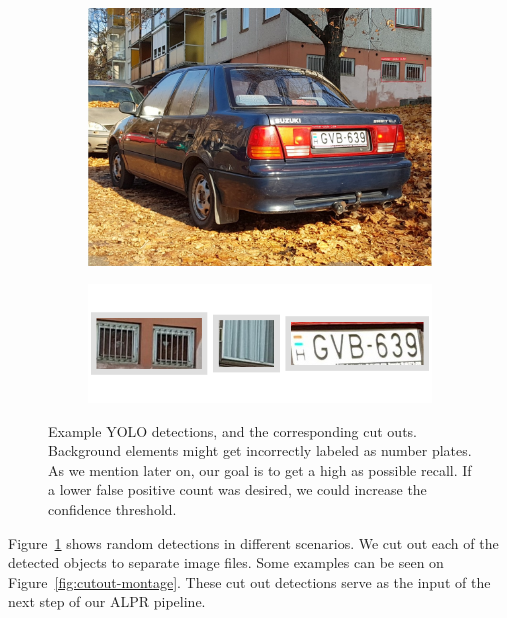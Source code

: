 \begin{figure}
\begin{subfigure}[b]{.15\textwidth}
    \end{subfigure}
    \hfill\hfill
    \\
    \begin{subfigure}[b]{.55\textwidth}
        \includegraphics[width=\textwidth]{figures/yolo/179.jpg}
    \end{subfigure}
    \hfill
    \begin{subfigure}[b]{.4\textwidth}
        \includegraphics[width=\textwidth]{figures/yolo/179_montage.png}
    \end{subfigure}
    \hfill
    \caption{Example YOLO detections, and the corresponding cut outs.
        Background elements might get incorrectly labeled as number plates.  As
        we mention later on, our goal is to get a high as possible recall. If
        a lower false positive count was desired, we could increase the
    confidence threshold.}
    \label{fig:yolo-detection-montages}
\end{figure}

Figure~\ref{fig:yolo-detection-montages}  shows random detections in different
scenarios. We cut out each of the detected objects to separate image files. Some
examples can be seen on Figure~\ref{fig:cutout-montage}.
These cut out detections serve as the input of the next step of our \ac{ALPR}
pipeline.

